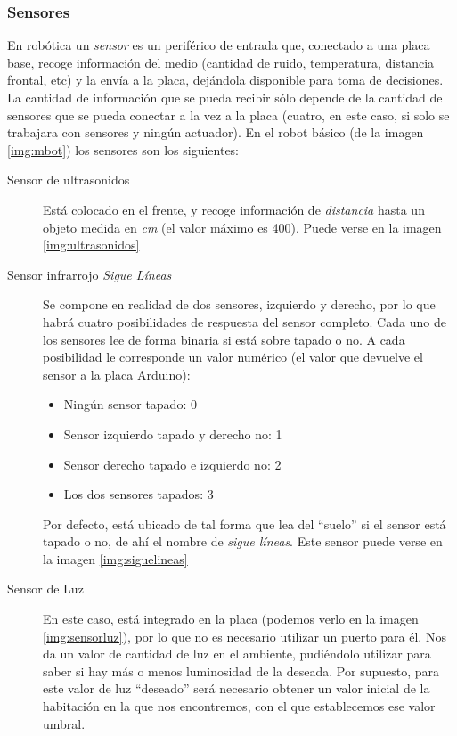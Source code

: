 \subsubsection{Sensores}\label{ssubsec:sensores}
En robótica un \textit{sensor} es un periférico de entrada que, conectado a una placa base, recoge información del medio (cantidad de ruido, temperatura, distancia frontal, etc) y la envía a la placa, dejándola disponible para toma de decisiones. La cantidad de información que se pueda recibir sólo depende de la cantidad de sensores que se pueda conectar a la vez a la placa (cuatro, en este caso, si solo se trabajara con sensores y ningún actuador). En el robot básico (de la imagen \ref{img:mbot}) los sensores son los siguientes:
\begin{description}
	\item [Sensor de ultrasonidos] Está colocado en el frente, y recoge información de \textit{distancia} hasta un objeto medida en \textit{cm} (el valor máximo es 400). Puede verse en la imagen \ref{img:ultrasonidos}
	
	\item [Sensor infrarrojo \textit{Sigue Líneas}] Se compone en realidad de dos sensores, izquierdo y derecho, por lo que habrá cuatro posibilidades de respuesta del sensor completo. Cada uno de los sensores lee de forma binaria si está sobre tapado o no. A cada posibilidad le corresponde un valor numérico (el valor que devuelve el sensor a la placa Arduino):
	\begin{itemize}
		\item Ningún sensor tapado: 0
		\item Sensor izquierdo tapado y derecho no: 1
		\item Sensor derecho tapado e izquierdo no: 2
		\item Los dos sensores tapados: 3
	\end{itemize}
	Por defecto, está ubicado de tal forma que lea del ``suelo'' si el sensor está tapado o no, de ahí el nombre de \textit{sigue líneas}. Este sensor puede verse en la imagen \ref{img:siguelineas}
	
	\item [Sensor de Luz] En este caso, está integrado en la placa (podemos verlo en la imagen \ref{img:sensorluz}), por lo que no es necesario utilizar un puerto para él. Nos da un valor de cantidad de luz en el ambiente, pudiéndolo utilizar para saber si hay más o menos luminosidad de la deseada. Por supuesto, para este valor de luz ``deseado'' será necesario obtener un valor inicial de la habitación en la que nos encontremos, con el que establecemos ese valor umbral.
\end{description}
